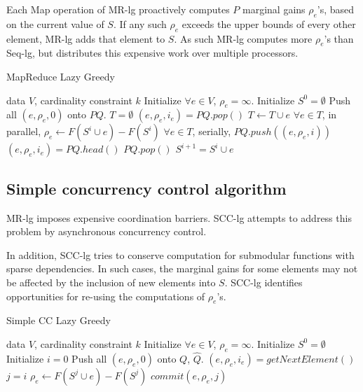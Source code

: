 \documentclass{article}
\newcommand{\seqlz}{Seq-lg}
\newcommand{\mrlz}{MR-lg}
\newcommand{\scclz}{SCC-lg}
\begin{document}
Each Map operation of \mrlz{} proactively computes $P$ marginal gains $\rho_e$'s, based on the current value of $S$.
If any such $\rho_e$ exceeds the upper bounds of every other element, \mrlz{} adds that element to $S$.
As such \mrlz{} computes more $\rho_e$'s than \seqlz{}, but distributes this expensive work over multiple processors.
\begin{algorithm}[tb]
  \caption{MapReduce Lazy Greedy}
  \label{alg:mrlz}
\begin{algorithmic}[1]
   data $V$, cardinality constraint $k$
  \STATE Initialize $\forall e \in V$, $\rho_e = \infty$.
  \STATE Initialize $S^0 = \emptyset$
  \STATE Push all $(e, \rho_e, 0)$ onto $PQ$.
      \STATE $T = \emptyset$
        \STATE $(e, \rho_e, i_e) = PQ.pop()$
        \STATE $T \leftarrow T \cup e$
      \ENDFOR
      \STATE $\forall e \in T$, in parallel, $\rho_e \leftarrow F(S^i\cup e) - F(S^i)$
      \STATE $\forall e \in T$, serially, $PQ.push((e, \rho_e, i))$
      \STATE $(e, \rho_e, i_e) = PQ.head()$
        \STATE $PQ.pop()$
        \STATE $S^{i+1} = S^i \cup e$
      \ENDIF
    \ENDWHILE
  \ENDFOR
\end{algorithmic}
\end{algorithm}



\subsection{Simple concurrency control algorithm}
\mrlz{} imposes expensive coordination barriers.
\scclz{} attempts to address this problem by asynchronous concurrency control.

In addition, \scclz{} tries to conserve computation for submodular functions with sparse dependencies.
In such cases, the marginal gains for some elements may not be affected by the inclusion of new elements into $S$.
\scclz{} identifies opportunities for re-using the computations of $\rho_e$'s.
\begin{algorithm}[tb]
  \caption{Simple CC Lazy Greedy}
  \label{alg:scclz}
\begin{algorithmic}[1]
   data $V$, cardinality constraint $k$
  \STATE Initialize $\forall e \in V$, $\rho_e = \infty$.
  \STATE Initialize $S^0 = \emptyset$
  \STATE Initialize $i = 0$
  \STATE Push all $(e, \rho_e, 0)$ onto $Q$, $\widehat{Q}$.
      \STATE $(e, \rho_e, i_e) = getNextElement()$
      \STATE $j = i$
        \STATE $\rho_e     \leftarrow F(S^j \cup e) - F(S^j)$
      \ENDIF
      \STATE $commit(e, \rho_e, j)$
    \ENDWHILE
  \ENDFOR
\end{algorithmic}
\end{algorithm}
\end{document}
